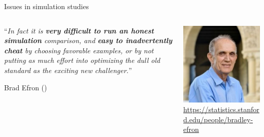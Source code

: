\documentclass[english, 12pt, aspectratio=169]{beamer}
\begin{document}
\begin{frame}{Issues in simulation studies}
    \begin{columns}
      \begin{column}{0.65\textwidth}
        \begin{block}{}
          \begin{tcolorbox}[colframe=chineseBlue]
            ``\emph{In fact it is \alert{\textbf{very difficult to run an \mbox{honest} simulation}} comparison, and \alert{\textbf{easy to \mbox{inadvertently} cheat}} by choosing favorable examples, or by not putting as much effort into optimizing the dull old standard as the exciting new challenger.}''

            \flushright Brad Efron (\citeyear{Breiman2001}) %
          \end{tcolorbox}
        \end{block}
      \end{column}
      \begin{column}{0.35\textwidth}
        \begin{block}{}
          \centering
          \includegraphics[width=0.8\linewidth,frame]{pics/efron2.jpg}
          {\tiny \color{gray} \href{https://statistics.stanford.edu/people/bradley-efron}{https://statistics.stanford.edu/people/bradley-efron}}
        \end{block}
      \end{column}
    \end{columns}
    
\end{frame}
\end{document}
